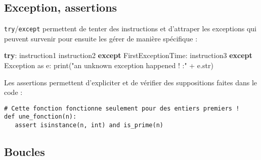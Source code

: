 \documentclass[]{article}
\newenvironment{Shaded}{}{}
\newcommand{\BuiltInTok}[1]{#1}
\newcommand{\ControlFlowTok}[1]{\textcolor[rgb]{0.00,0.44,0.13}{\textbf{#1}}}
\newcommand{\DecValTok}[1]{\textcolor[rgb]{0.25,0.63,0.44}{#1}}
\newcommand{\ImportTok}[1]{#1}
\newcommand{\NormalTok}[1]{#1}
\newcommand{\OperatorTok}[1]{\textcolor[rgb]{0.40,0.40,0.40}{#1}}
\newcommand{\PreprocessorTok}[1]{\textcolor[rgb]{0.74,0.48,0.00}{#1}}
\newcommand{\StringTok}[1]{\textcolor[rgb]{0.25,0.44,0.63}{#1}}
\begin{document}
\begin{Shaded}
\end{Shaded}

\hypertarget{exception-assertions}{%
\subsection{Exception, assertions}\label{exception-assertions}}

\texttt{try}/\texttt{except} permettent de tenter des instructions et
d'attraper les exceptions qui peuvent survenir pour ensuite les gérer de
manière spécifique :

\begin{Shaded}
\begin{Highlighting}[]
\ControlFlowTok{try}\NormalTok{:}
\NormalTok{   instruction1}
\NormalTok{   instruction2}
\ControlFlowTok{except}\NormalTok{ FirstExceptionTime:}
\NormalTok{   instruction3}
\ControlFlowTok{except} \PreprocessorTok{Exception} \ImportTok{as}\NormalTok{ e:}
   \BuiltInTok{print}\NormalTok{(}\StringTok{"an unknown exception happened ! :"} \OperatorTok{+}\NormalTok{ e.}\BuiltInTok{str}\NormalTok{)}
\end{Highlighting}
\end{Shaded}

Les assertions permettent d'expliciter et de vérifier des suppositions
faites dans le code :

\begin{verbatim}
# Cette fonction fonctionne seulement pour des entiers premiers !
def une_fonction(n):
   assert isinstance(n, int) and is_prime(n)
\end{verbatim}

\hypertarget{boucles}{%
\subsection{Boucles}\label{boucles}}
\end{document}
